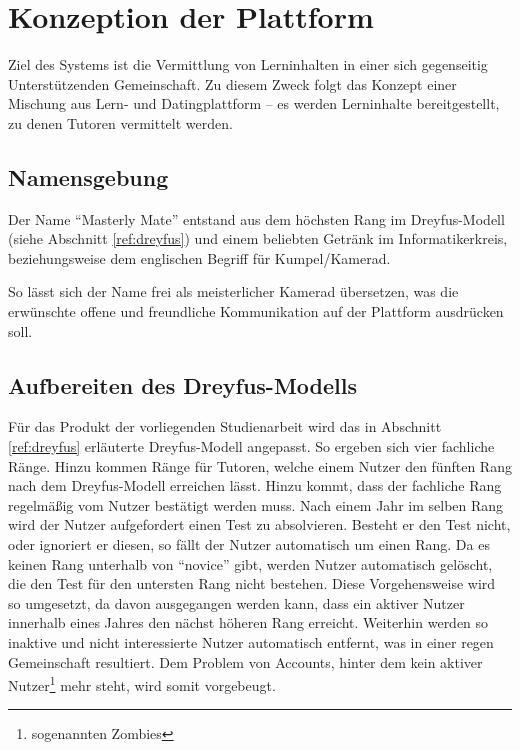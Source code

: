 

\chapter{Konzeption der Plattform}\label{ref:chaptConcept}
Ziel des Systems ist die Vermittlung von Lerninhalten in einer sich gegenseitig
Unterstützenden Gemeinschaft. Zu diesem Zweck folgt das Konzept einer Mischung
aus Lern- und Datingplattform -- es werden Lerninhalte bereitgestellt, zu denen
Tutoren vermittelt werden.

\section{Namensgebung}
Der Name "`Masterly Mate"' entstand aus dem höchsten Rang im Dreyfus-Modell
(siehe Abschnitt \ref{ref:dreyfus}) und einem beliebten Getränk im
Informatikerkreis, beziehungsweise dem englischen Begriff für Kumpel/Kamerad.

So lässt sich der Name frei als meisterlicher Kamerad übersetzen, was die
erwünschte offene und freundliche Kommunikation auf der Plattform ausdrücken
soll.

\section{Aufbereiten des Dreyfus-Modells}\label{ref:dreyfusConcept} 
Für das Produkt der vorliegenden Studienarbeit wird das in Abschnitt
\ref{ref:dreyfus} erläuterte Dreyfus-Modell angepasst. So ergeben sich vier
fachliche Ränge. Hinzu kommen Ränge für Tutoren, welche einem Nutzer den fünften
Rang nach dem Dreyfus-Modell erreichen lässt. Hinzu kommt, dass der fachliche
Rang regelmäßig vom Nutzer bestätigt werden muss. Nach einem Jahr im selben Rang
wird der Nutzer aufgefordert einen Test zu absolvieren.
Besteht er den Test nicht, oder ignoriert er diesen, so fällt der Nutzer
automatisch um einen Rang. Da es keinen Rang unterhalb von "`novice"' gibt,
werden Nutzer automatisch gelöscht, die den Test für den untersten Rang nicht
bestehen. Diese Vorgehensweise wird so umgesetzt, da davon ausgegangen werden
kann, dass ein aktiver Nutzer innerhalb eines Jahres den nächst höheren Rang
erreicht. Weiterhin werden so inaktive und nicht interessierte Nutzer
automatisch entfernt, was in einer regen Gemeinschaft resultiert. Dem Problem
von Accounts, hinter dem kein aktiver Nutzer\footnote{sogenannten Zombies} mehr
steht, wird somit vorgebeugt.

